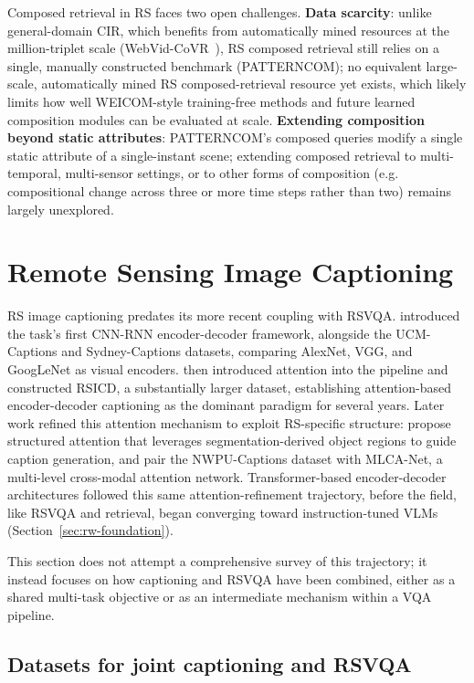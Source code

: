 Composed retrieval in RS faces two open challenges. \textbf{Data scarcity}: unlike general-domain CIR, which benefits from automatically mined resources at the million-triplet scale (WebVid-CoVR~\cite{ventura2024covr}), RS composed retrieval still relies on a single, manually constructed benchmark (PATTERNCOM); no equivalent large-scale, automatically mined RS composed-retrieval resource yet exists, which likely limits how well WEICOM-style training-free methods and future learned composition modules can be evaluated at scale. \textbf{Extending composition beyond static attributes}: PATTERNCOM's composed queries modify a single static attribute of a single-instant scene; extending composed retrieval to multi-temporal, multi-sensor settings, or to other forms of composition (e.g. compositional change across three or more time steps rather than two) remains largely unexplored.

\section{Remote Sensing Image Captioning}
\label{sec:rw-captioning}

RS image captioning predates its more recent coupling with RSVQA. \textcite{qu2016exploring} introduced the task's first CNN-RNN encoder-decoder framework, alongside the UCM-Captions and Sydney-Captions datasets, comparing AlexNet, VGG, and GoogLeNet as visual encoders. \textcite{lu2017exploring} then introduced attention into the pipeline and constructed RSICD, a substantially larger dataset, establishing attention-based encoder-decoder captioning as the dominant paradigm for several years. Later work refined this attention mechanism to exploit RS-specific structure: \textcite{zhao2021structured} propose structured attention that leverages segmentation-derived object regions to guide caption generation, and \textcite{cheng2022nwpu} pair the NWPU-Captions dataset with MLCA-Net, a multi-level cross-modal attention network. Transformer-based encoder-decoder architectures followed this same attention-refinement trajectory, before the field, like RSVQA and retrieval, began converging toward instruction-tuned VLMs (Section~\ref{sec:rw-foundation}).
 
This section does not attempt a comprehensive survey of this trajectory; it instead focuses on how captioning and RSVQA have been combined, either as a shared multi-task objective or as an intermediate mechanism within a VQA pipeline.
 
\subsection{Datasets for joint captioning and RSVQA}
\label{sec:rw-captioning-datasets}

